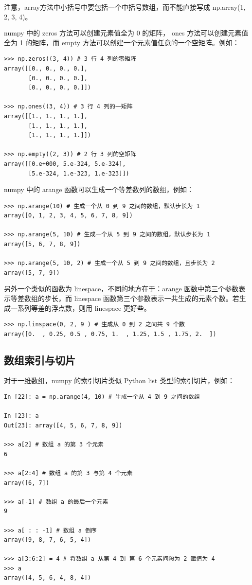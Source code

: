 注意，array方法中小括号中要包括一个中括号数组，而不能直接写成 np.array(1, 2, 3, 4)。

numpy 中的 zeros 方法可以创建元素值全为 0 的矩阵， ones 方法可以创建元素值全为 1 的矩阵，而 empty 方法可以创建一个元素值任意的一个空矩阵。例如：

\begin{lstlisting}[Language=Python]
>>> np.zeros((3, 4)) # 3 行 4 列的零矩阵
array([[0., 0., 0., 0.],
       [0., 0., 0., 0.],
       [0., 0., 0., 0.]])

>>> np.ones((3, 4)) # 3 行 4 列的一矩阵
array([[1., 1., 1., 1.],
       [1., 1., 1., 1.],
       [1., 1., 1., 1.]])

>>> np.empty((2, 3)) # 2 行 3 列的空矩阵
array([[0.e+000, 5.e-324, 5.e-324],
       [5.e-324, 1.e-323, 1.e-323]])
\end{lstlisting}

numpy 中的 arange 函数可以生成一个等差数列的数组，例如：

\begin{lstlisting}[Language=Python]
>>> np.arange(10) # 生成一个从 0 到 9 之间的数组，默认步长为 1
array([0, 1, 2, 3, 4, 5, 6, 7, 8, 9])

>>> np.arange(5, 10) # 生成一个从 5 到 9 之间的数组，默认步长为 1
array([5, 6, 7, 8, 9])

>>> np.arange(5, 10, 2) # 生成一个从 5 到 9 之间的数组，且步长为 2
array([5, 7, 9])
\end{lstlisting}

另外一个类似的函数为 linespace，不同的地方在于：arange 函数中第三个参数表示等差数组的步长，而 linespace 函数第三个参数表示一共生成的元素个数。若生成一系列等差的浮点数，则用 linespace 更好些。

\begin{lstlisting}[Language=Python]
>>> np.linspace(0, 2, 9 ) # 生成从 0 到 2 之间共 9 个数
array([0.  , 0.25, 0.5 , 0.75, 1.  , 1.25, 1.5 , 1.75, 2.  ])
\end{lstlisting}

\subsection{数组索引与切片}

对于一维数组，numpy 的索引切片类似 Python list 类型的索引切片，例如：

\begin{lstlisting}[Language=Python]
In [22]: a = np.arange(4, 10) # 生成一个从 4 到 9 之间的数组

In [23]: a
Out[23]: array([4, 5, 6, 7, 8, 9])

>>> a[2] # 数组 a 的第 3 个元素
6

>>> a[2:4] # 数组 a 的第 3 与第 4 个元素
array([6, 7])

>>> a[-1] # 数组 a 的最后一个元素
9

>>> a[ : : -1] # 数组 a 倒序
array([9, 8, 7, 6, 5, 4])

>>> a[3:6:2] = 4 # 将数组 a 从第 4 到 第 6 个元素间隔为 2 赋值为 4
>>> a
array([4, 5, 6, 4, 8, 4])
\end{lstlisting}

